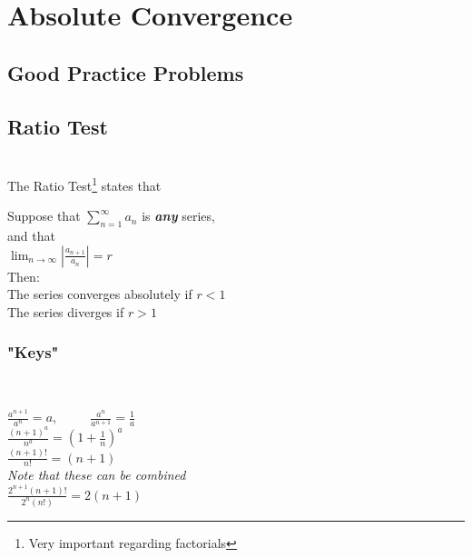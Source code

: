 \documentclass{article}
\begin{document}
\section{\centering \huge Absolute Convergence \\ }
    \subsection{Good Practice Problems}
    \subsection{Ratio Test} 
    \hrulefill \\[10pt]

    The Ratio Test\footnote{Very important regarding factorials} states that 
        
        \begingroup
        \centering
        Suppose that $\displaystyle \sum_{n=1}^{\infty} a_n$ is \textit{\textbf{any}} series,\\
        and that\\[5pt]\textbf{}
        $\displaystyle \lim_{n \rightarrow \infty} \left| \frac{a_{n+1}}{a_n} \right| = r$\\[10pt]
        Then: \\[5pt]
        The series converges absolutely if $r < 1$\\
        The series diverges if $r > 1$\\
        \endgroup
    \subsubsection{"Keys"}
        \hrulefill\\ [5pt]
        \begingroup
        \centering
        \large
        
        $\displaystyle \frac{a^{n+1}}{a^n} = a$, ~~~~ $\displaystyle \frac{a^{n}}{a^{n+1}} = \frac{1}{a}$ \\ [15pt]



        $\displaystyle \frac{(n+1)^{a}}{n^{a}} = \left(1+\frac{1}{n}\right)^a$ \\ [15pt]

        $\displaystyle \frac{(n+1)!}{n!} = (n + 1) $\\ [15pt]

        \textit{Note that these can be combined} \\ [5pt]
        $\frac{2^{n+1}(n+1)!}{2^n(n!)} = 2(n+1)$
\end{document}
